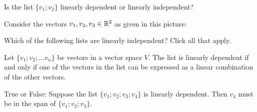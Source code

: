Is the list $\{v_1; v_2\}$ linearly dependent or linearly independent?  


\edXsolution{ 
}


\endedxproblem



\endedxvertical










Consider the vectors $v_1, v_2, v_3 \in \mathbb R^2$ as given in this picture:


\begin{center}
   
\end{center}

Which of the following lists are linearly independent?  Click all that apply.  




\edXsolution{ 
}


\endedxproblem




\endedxvertical



Let $\{v_1; v_2; \ldots v_n\}$ be vectors in a vector space $V$.  The list is linearly dependent
if and only if one of the vectors in the list can be expressed as a linear combination of the other 
vectors.  

\endedxtext



True or False: Suppose the list $\{v_1; v_2; v_3; v_4\}$ is linearly dependent.  Then $v_4$ must be in the 
span of $\{v_1; v_2; v_3\}$.  



\edXsolution{ 
}


